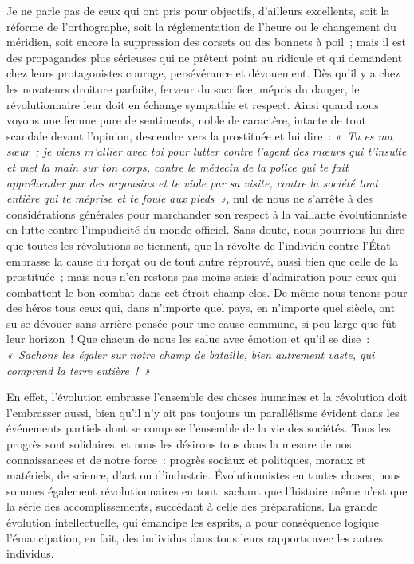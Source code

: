 \documentclass[french,twoside]{book} %
\begin{document}
Je ne parle pas de ceux qui ont pris pour objectifs, d’ailleurs excellents, soit la réforme de l’orthographe, soit la réglementation de l’heure ou le changement du méridien, soit encore la suppression des corsets ou des bonnets à poil ; mais il est des propagandes plus sérieuses qui ne prêtent point au ridicule  et qui demandent chez leurs protagonistes courage, persévérance et dévouement. Dès qu’il y a chez les novateurs droiture parfaite, ferveur du sacrifice, mépris du danger, le révolutionnaire leur doit en échange sympathie et respect. Ainsi quand nous voyons une femme pure de sentiments, noble de caractère, intacte de tout scandale devant l’opinion, descendre vers la prostituée et lui dire : \emph{« Tu es ma sœur ; je viens m’allier avec toi pour lutter contre l’agent des mœurs qui t’insulte et met la main sur ton corps, contre le médecin de la police qui te fait appréhender par des argousins et te viole par sa visite, contre la société tout entière qui te méprise et te foule aux pieds »}, nul de nous ne s’arrête à des considérations  générales pour marchander son respect à la vaillante évolutionniste en lutte contre l’impudicité du monde officiel. Sans doute, nous pourrions lui dire que toutes les révolutions se tiennent, que la révolte de l’individu contre l’État embrasse la cause du forçat ou de tout autre réprouvé, aussi bien que celle de la prostituée ; mais nous n’en restons pas moins saisis d’admiration pour ceux qui combattent le bon combat dans cet étroit champ clos. De même nous tenons pour des héros tous ceux qui, dans n’importe quel pays, en n’importe quel siècle, ont su se dévouer sans arrière-pensée pour une cause commune, si peu large que fût leur horizon ! Que chacun de nous les salue avec émotion et qu’il se dise : \emph{« Sachons les égaler sur notre champ  de bataille, bien autrement vaste, qui comprend la terre entière ! »}\par
En effet, l’évolution embrasse l’ensemble des choses humaines et la révolution doit l’embrasser aussi, bien qu’il n’y ait pas toujours un parallélisme évident dans les événements partiels dont se compose l’ensemble de la vie des sociétés. Tous les progrès sont solidaires, et nous les désirons tous dans la mesure de nos connaissances et de notre force : progrès sociaux et politiques, moraux et matériels, de science, d’art ou d’industrie. Évolutionnistes en toutes choses, nous sommes également révolutionnaires en tout, sachant que l’histoire même n’est que la série des accomplissements, succédant à celle des préparations. La grande évolution intellectuelle,  qui émancipe les esprits, a pour conséquence logique l’émancipation, en fait, des individus dans tous leurs rapports avec les autres individus.\par
\end{document}
